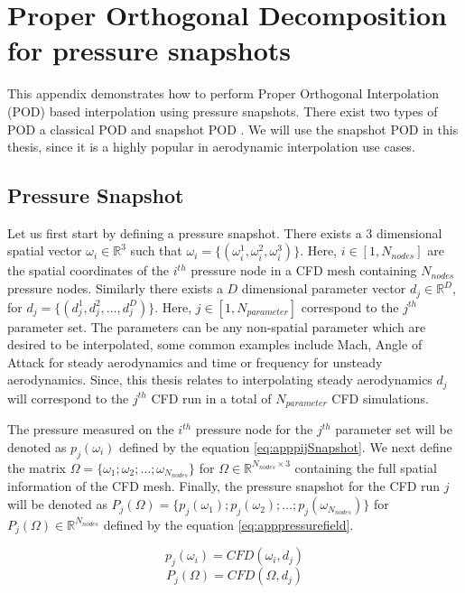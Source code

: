 \chapter{Proper Orthogonal Decomposition for pressure snapshots}\label{appPODI}
This appendix demonstrates how to perform Proper Orthogonal Interpolation (POD) based interpolation using pressure snapshots. There exist two types of POD a classical POD \cite{gurvich1969atmospheric} and snapshot POD \cite{romanowski1996reduced}. We will use the snapshot POD in this thesis, since it is a highly popular in aerodynamic interpolation use cases. 

\section{Pressure Snapshot}
Let us first start by defining a pressure snapshot. There exists a \(3\) dimensional spatial vector \(\omega_{i} \in  \mathbb{R}^{3}\) such that \(\omega_{i} = \{(\omega_{i}^{1}, \omega_{i}^{2}, \omega_{i}^{3})\}\). Here, \(i \in [1,N_{nodes}] \) are the spatial coordinates of the \(i^{th}\) pressure node in a CFD mesh containing \(N_{nodes}\) pressure nodes. Similarly there exists a \(D\) dimensional parameter vector \(d_{j} \in  \mathbb{R}^{D}\), for \(d_{j} = \{(d_{j}^{1}, d_{j}^{2}, \ldots ,d_{j}^{D})\}\). Here,   \(j \in [1,N_{parameter}] \) correspond to the \(j^{th}\) parameter set. The parameters can be any non-spatial parameter which are desired to be interpolated, some common examples include Mach, Angle of Attack for steady aerodynamics and time or frequency for unsteady aerodynamics. Since, this thesis relates to interpolating steady aerodynamics \(d_{j}\) will correspond to the \(j^{th}\) CFD run in a total of \(N_{parameter}\) CFD simulations. 

The pressure measured on the \(i^{th}\) pressure node for the \(j^{th}\) parameter set will be denoted as \(p_{j}(\omega_{i})\) defined by the equation \ref{eq:apppijSnapshot}. We next define the matrix \(\Omega = \{\omega_{1}; \omega_{2}; \ldots ; \omega_{N_{nodes}}\}\) for \(\Omega \in \mathbb{R}^{N_{nodes} \times 3}\) containing the full spatial information of the CFD mesh. Finally, the pressure snapshot for the CFD run \(j\) will be denoted as \(P_{j}(\Omega) = \{p_{j}(\omega_{1}); p_{j}(\omega_{2}); \ldots ; p_{j}(\omega_{N_{nodes}})\}\) for \(P_{j}(\Omega) \in \mathbb{R}^{N_{nodes}}\) defined by the equation \ref{eq:apppressurefield}.

\begin{equation} \label{eq:apppijSnapshot}
p_{j}(\omega_{i}) = CFD(\omega_{i}, d_{j})
\end{equation} 
\begin{equation}\label{eq:apppressurefield}
P_{j}(\Omega) = CFD(\Omega, d_{j})
\end{equation} 


